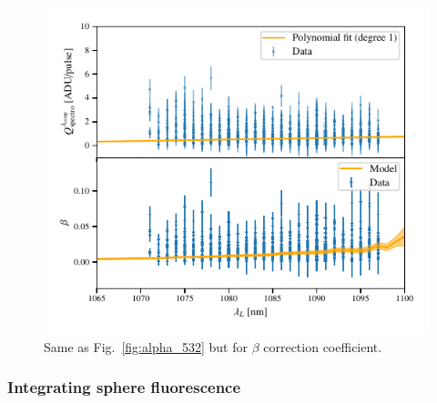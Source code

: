 \begin{figure}%
    \centering
    \includegraphics[width=\columnwidth]{fig/beta_532_qswMAX.pdf}
    \caption{Same as Fig.~\ref{fig:alpha_532} but for $\beta$ correction coefficient.}
    \label{fig:beta}
\end{figure}


\subsubsection{Integrating sphere fluorescence}\label{sec:fluorescence}


